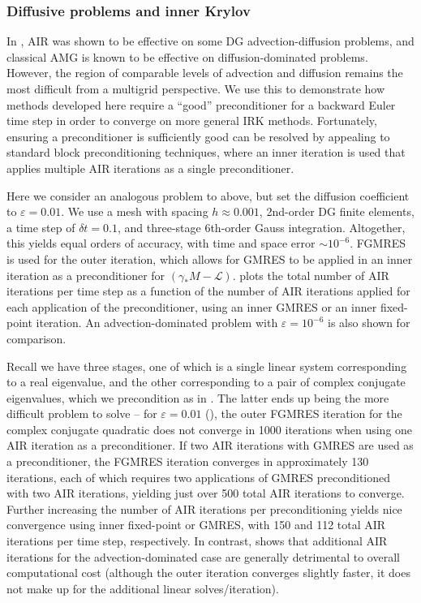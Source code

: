 \documentclass[review]{siamart}
\begin{document}
\subsubsection{Diffusive problems and inner Krylov}\label{sec:numerics:dg:diff}

In \cite{AIR2}, AIR was shown to be effective on some DG advection-diffusion
problems, and classical AMG is known to be effective on diffusion-dominated
problems. However, the region of comparable levels of advection and diffusion
remains the most difficult from a multigrid perspective. We use this to
demonstrate how methods developed here require a ``good'' preconditioner
for a backward Euler time step in order to converge on more general IRK
methods. Fortunately, ensuring a preconditioner is sufficiently good can be
resolved by appealing to standard block preconditioning techniques, where an inner
iteration is used that applies multiple AIR iterations as a single preconditioner.

Here we consider an analogous problem to above, but set the diffusion coefficient
to $\varepsilon = 0.01$. We use a mesh with spacing $h \approx 0.001$, 2nd-order
DG finite elements, a time step of $\delta t = 0.1$, and three-stage 6th-order
Gauss integration. Altogether, this yields equal orders of accuracy, with time and
space error $\sim10^{-6}$. FGMRES \cite{saad1993flexible} is used for the
outer iteration, which allows for GMRES to be applied in an inner iteration
as a preconditioner for $(\gamma_* M - \mathcal{L})$.  plots the
total number of AIR iterations per time step as a function of the number of
AIR iterations applied for each application of the preconditioner, using an
inner GMRES or an inner fixed-point iteration. An advection-dominated problem
with $\varepsilon = 10^{-6}$ is also shown for comparison.

Recall we have three stages, one of which is a single linear system corresponding
to a real eigenvalue, and the other corresponding to a pair of complex conjugate
eigenvalues, which we precondition as in . The latter ends up being
the more difficult problem to solve -- for $\varepsilon =0.01$ (),
the outer FGMRES iteration for the complex conjugate quadratic does not converge in
1000 iterations when using one AIR iteration as a preconditioner.
If two AIR iterations with GMRES are used as a preconditioner,
the FGMRES iteration converges in approximately 130 iterations, each of which
requires two applications of GMRES preconditioned with two AIR iterations,
yielding just over 500 total AIR iterations to converge. Further increasing
the number of AIR iterations per preconditioning yields nice convergence
using inner fixed-point or GMRES, with 150 and 112 total AIR iterations per
time step, respectively. In contrast,  shows that
additional AIR iterations for the advection-dominated case are generally
detrimental to overall computational cost (although the outer iteration
converges slightly faster, it does not make up for the additional linear
solves/iteration).
\end{document}
